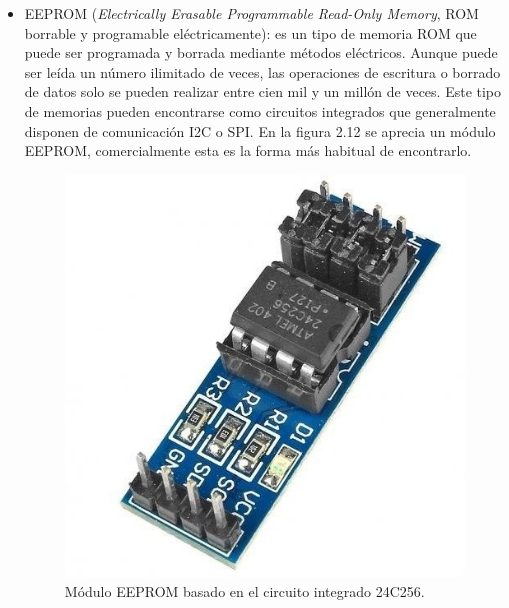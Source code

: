 \begin{itemize}
	\item EEPROM (\textit{Electrically Erasable Programmable Read-Only Memory}, ROM borrable y programable eléctricamente): es un tipo de memoria ROM que puede ser programada y borrada mediante métodos eléctricos. Aunque puede ser leída un número ilimitado de veces, las operaciones de escritura o borrado de datos solo se pueden realizar entre cien mil y un millón de veces. Este tipo de memorias pueden encontrarse como circuitos integrados que generalmente disponen de comunicación I2C o SPI. En la figura 2.12 se aprecia un módulo EEPROM, comercialmente esta es la forma más habitual de encontrarlo.
	\begin{figure}[h]
		\centering
		\includegraphics[scale=0.33]{./Figures/eeprom.jpg}
		\caption{Módulo EEPROM basado en el circuito integrado 24C256\protect\footnotemark.}
		\label{fig:cuadradoAzul}
	\end{figure}



\end{itemize}
